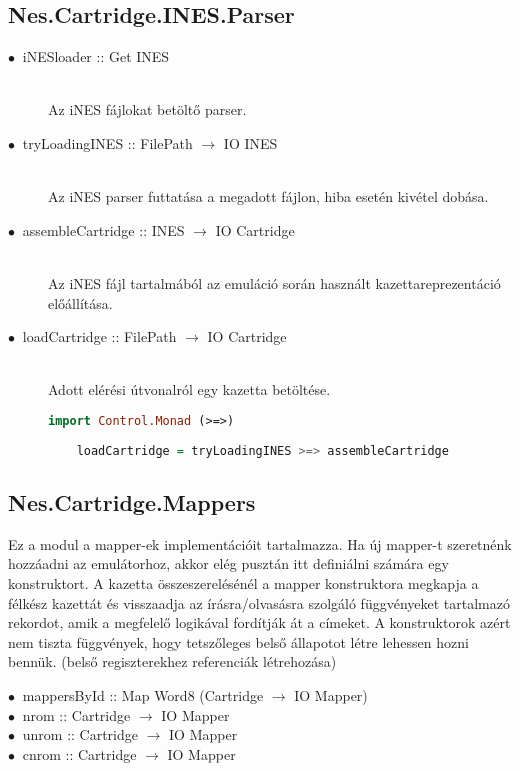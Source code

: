 \subsection{Nes.Cartridge.INES.Parser}

\begin{description}
	\item[$\bullet\:$ iNESloader :: Get INES] \hfill \\
	Az iNES fájlokat betöltő parser.
	\item[$\bullet\:$ tryLoadingINES :: FilePath $\rightarrow$ IO INES] \hfill \\
	Az iNES parser futtatása a megadott fájlon, hiba esetén kivétel dobása.
	\item[$\bullet\:$ assembleCartridge :: INES $\rightarrow$ IO Cartridge] \hfill \\
	Az iNES fájl tartalmából az emuláció során használt kazettareprezentáció előállítása.
	\item[$\bullet\:$ loadCartridge :: FilePath $\rightarrow$ IO Cartridge] \hfill \\
	Adott elérési útvonalról egy kazetta betöltése.
	\begin{lstlisting}[language=Haskell]
	import Control.Monad (>=>)
	
	loadCartridge = tryLoadingINES >=> assembleCartridge
	\end{lstlisting}
\end{description}

\subsection{Nes.Cartridge.Mappers}

Ez a modul a mapper-ek implementációit tartalmazza. Ha új mapper-t szeretnénk hozzáadni az emulátorhoz, akkor elég pusztán itt definiálni számára egy konstruktort. A kazetta összeszerelésénél a mapper konstruktora megkapja a félkész kazettát és visszaadja az írásra/olvasásra szolgáló függvényeket tartalmazó rekordot, amik a megfelelő logikával fordítják át a címeket.
A konstruktorok azért nem tiszta függvények, hogy tetszőleges belső állapotot létre lehessen hozni bennük. (belső regiszterekhez referenciák létrehozása)   

\begin{description}
	\item[$\bullet\:$ mappersById :: Map Word8 (Cartridge $\rightarrow$ IO Mapper)]
	\item[$\bullet\:$ nrom  :: Cartridge $\rightarrow$ IO Mapper]
	\item[$\bullet\:$ unrom :: Cartridge $\rightarrow$ IO Mapper]
	\item[$\bullet\:$ cnrom :: Cartridge $\rightarrow$ IO Mapper]
\end{description}

